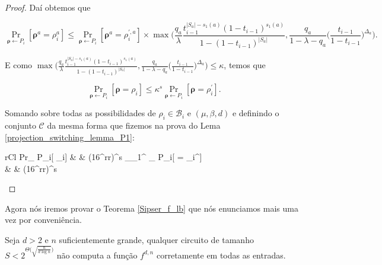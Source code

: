 \begin{proof}
	Daí obtemos que
	
	\begin{equation*}
		\Pr_{\boldsymbol{\rho} \leftarrow P_{i}}[\boldsymbol{\rho}^{a} = \rho_{i}^{a}] \leq \Pr_{\boldsymbol{\rho} \leftarrow P_{i}}[\boldsymbol{\rho}^{a} = \rho_{i}^{\prime, a}] \times \max \Bigg( \frac{q_{a}}{\lambda}\frac{t_{i - 1}^{\lvert S_{a} \rvert - s_{1}(a)}(1 - t_{i - 1})^{s_{1}(a)}}{1 - (1 - t_{i - 1})^{\lvert S_{a} \rvert}}, \frac{q_{a}}{1 - \lambda - q_{a}} \bigg( \frac{t_{i - 1}}{1 - t_{i - 1}}\bigg)^{\Delta_{a}} \Bigg).
	\end{equation*}
	
	E como $\max \Bigg( \frac{q_{a}}{\lambda}\frac{t_{i - 1}^{\lvert S_{a} \rvert - s_{1}(a)}(1 - t_{i - 1})^{s_{1}(a)}}{1 - (1 - t_{i - 1})^{\lvert S_{a} \rvert}}, \frac{q_{a}}{1 - \lambda - q_{a}} \bigg( \frac{t_{i - 1}}{1 - t_{i - 1}}\bigg)^{\Delta_{a}} \Bigg) \leq \kappa$, temos que
	
	\begin{equation*}
		\Pr_{\boldsymbol{\rho} \leftarrow P_{i}}[\boldsymbol{\rho} = \rho_{i}] \leq \kappa^{s}\Pr_{\boldsymbol{\rho} \leftarrow P_{i}}[\boldsymbol{\rho} = \rho_{i}^{\prime}].
	\end{equation*}
	
	Somando sobre todas as possibilidades de $\rho_{i} \in \mathcal{B}_{i}$ e $(\mu, \beta, d)$ e definindo o conjunto $\mathcal{C}$ da mesma forma que fizemos na prova do Lema \ref{projection_switching_lemma_P1}:
	
	\begin{IEEEeqnarray*} {rCl}
		Pr_{\boldsymbol{\rho} \leftarrow P_{i}}[\boldsymbol{\rho} \in {}_{i}] & \leq & (16^{r}r)^{s} \sum_{\rho_{1}^{\prime} \in {}} \Pr_{\boldsymbol{\rho} \leftarrow P_{i}}[\boldsymbol{\rho} = \rho_{i}^{\prime}] \\
														& \leq & (16^{r}r)^{s}
	\end{IEEEeqnarray*}

\end{proof}

Agora nós iremos provar o Teorema \ref{Sipser_f_lb} que nós enunciamos mais uma vez por conveniência.

\begin{teo} \label{Sipser_f_lb_2}

Seja $d > 2$ e $n$ suficientemente grande, qualquer circuito de tamanho $S < 2^{\Theta\big(\sqrt{\frac{n}{d\log n}}\big)}$ não computa a função $f^{d, n}$ corretamente em todas as entradas.

\end{teo} 

